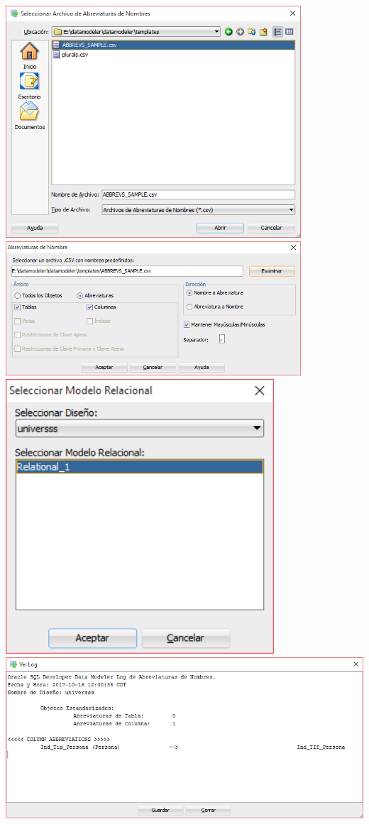 \documentclass[a4paper,openright,12pt]{book}
\begin{document}
\begin{center}
\includegraphics[width=11cm]{./images/5-1 Ejercicio 2/4.png}\\
\includegraphics[width=11cm]{./images/5-1 Ejercicio 2/5.png}\\
\includegraphics[width=10cm]{./images/5-1 Ejercicio 2/6.png}\\
\includegraphics[width=14cm]{./images/5-1 Ejercicio 2/7.png}\\

\end{center}
\end{document}
